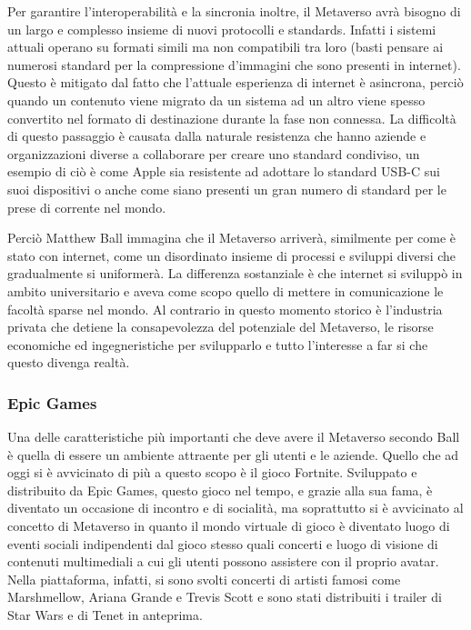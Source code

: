     Per garantire l'interoperabilità e la sincronia inoltre, il Metaverso avrà bisogno di un largo e complesso insieme di nuovi protocolli e standards.
    Infatti i sistemi attuali operano su formati simili ma non compatibili tra loro (basti pensare ai numerosi standard per la compressione d'immagini che sono presenti in internet).
    Questo è mitigato dal fatto che l'attuale esperienza di internet è asincrona, perciò quando un contenuto viene migrato da un sistema ad un altro viene spesso convertito nel formato di destinazione durante la fase non connessa.
    La difficoltà di questo passaggio è causata dalla naturale resistenza che hanno aziende e organizzazioni diverse a collaborare per creare uno standard condiviso, un esempio di ciò è come Apple sia resistente ad adottare lo standard USB-C sui suoi dispositivi o anche come siano presenti un gran numero di standard per le prese di corrente nel mondo.

    Perciò Matthew Ball immagina che il Metaverso arriverà, similmente per come è stato con internet, come un disordinato insieme di processi e sviluppi diversi che gradualmente si uniformerà.
    La differenza sostanziale è che internet si sviluppò in ambito universitario e aveva come scopo quello di mettere in comunicazione le facoltà sparse nel mondo.
    Al contrario in questo momento storico è l'industria privata che detiene la consapevolezza del potenziale del Metaverso, le risorse economiche ed ingegneristiche per svilupparlo e tutto l'interesse a far si che questo divenga realtà.

        \subsubsection{Epic Games} \label{EpicGames}

        Una delle caratteristiche più importanti che deve avere il Metaverso secondo Ball è quella di essere un ambiente attraente per gli utenti e le aziende.
        Quello che ad oggi si è avvicinato di più a questo scopo è il gioco Fortnite.
        Sviluppato e distribuito da Epic Games, questo gioco nel tempo, e grazie alla sua fama, è diventato un occasione di incontro e di socialità, ma soprattutto si è avvicinato al concetto di Metaverso in quanto il mondo virtuale di gioco è diventato luogo di eventi sociali indipendenti dal gioco stesso quali concerti e luogo di visione di contenuti multimediali a cui gli utenti possono assistere con il proprio avatar.
        Nella piattaforma, infatti, si sono svolti concerti di artisti famosi come Marshmellow, Ariana Grande e Trevis Scott e sono stati distribuiti i trailer di Star Wars e di Tenet in anteprima.

